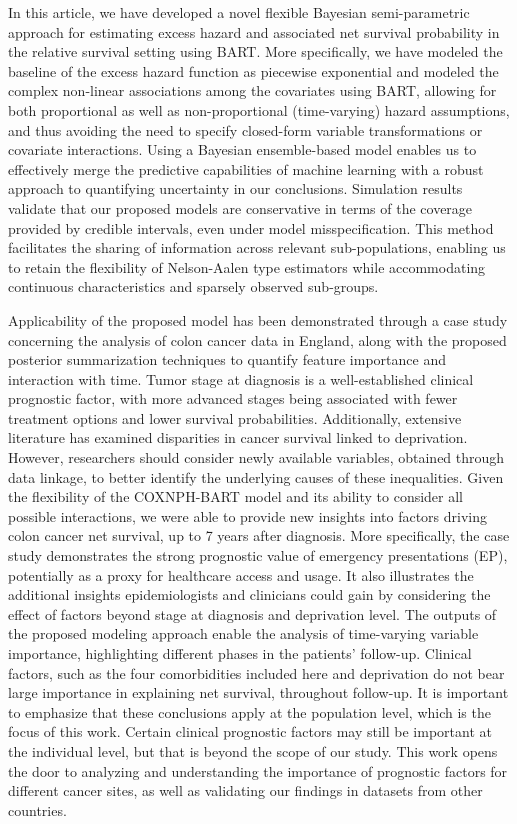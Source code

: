 \documentclass[12pt]{article}
\begin{document}
In this article, we have developed a novel flexible Bayesian semi-parametric approach for estimating excess hazard and associated net survival probability in the relative survival setting using BART. More specifically, we have modeled the baseline of the excess hazard function as piecewise exponential and modeled the complex non-linear associations among the covariates using BART, allowing for both proportional as well as non-proportional (time-varying) hazard assumptions, and thus avoiding the need to specify closed-form variable transformations or covariate interactions. Using a Bayesian ensemble-based model enables us to effectively merge the predictive capabilities of machine learning with a robust approach to quantifying uncertainty in our conclusions. Simulation results validate that our proposed models are conservative in terms of the coverage provided by credible intervals, even under model misspecification. This method facilitates the sharing of information across relevant sub-populations, enabling us to retain the flexibility of Nelson-Aalen type estimators while accommodating continuous characteristics and sparsely observed sub-groups. 

Applicability of the proposed model has been demonstrated through a case study concerning the analysis of colon cancer data in England, along with the proposed posterior summarization techniques to quantify feature importance and interaction with time. Tumor stage at diagnosis is a well-established clinical prognostic factor, with more advanced stages being associated with fewer treatment options and lower survival probabilities. Additionally, extensive literature has examined disparities in cancer survival linked to deprivation. However, researchers should consider newly available variables, obtained through data linkage, to better identify the underlying causes of these inequalities. Given the flexibility of the COXNPH-BART model and its ability to consider all possible interactions, we were able to provide new insights into factors driving colon cancer net survival, up to 7 years after diagnosis. More specifically, the case study demonstrates the strong prognostic value of emergency presentations (EP), potentially as a proxy for healthcare access and usage. It also illustrates the additional insights epidemiologists and clinicians could gain by considering the effect of factors beyond stage at diagnosis and deprivation level. The outputs of the proposed modeling approach enable the analysis of time-varying variable importance, highlighting different phases in the patients' follow-up. Clinical factors, such as the four comorbidities included here and deprivation do not bear large importance in explaining net survival, throughout follow-up. It is important to emphasize that these conclusions apply at the population level, which is the focus of this work. Certain clinical prognostic factors may still be important at the individual level, but that is beyond the scope of our study. This work opens the door to analyzing and understanding the importance of prognostic factors for different cancer sites, as well as validating our findings in datasets from other countries.
\end{document}
